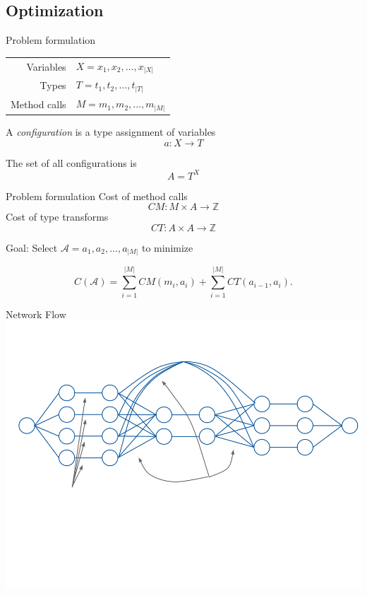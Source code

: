\documentclass{beamer}
\newcommand{\ZZ}{\mathbb{Z}}
\newcommand{\Acal}{\mathcal{A}}
\begin{document}
\subsection{Optimization}

\begin{frame}{Problem formulation}
  \begin{tabular}{rl}
  Variables &$X = x_1, x_2, \dotsc, x_{|X|}$ \\
  Types &$T = t_1, t_2, \dotsc, t_{|T|}$ \\
  Method calls &$M = m_1, m_2, \dotsc, m_{|M|}$
  \end{tabular}
  \vspace{0.5cm}

  A {\em configuration} is a type assignment of variables \[a : X \rightarrow T\]

  The set of all configurations is \[A = T^{X}\]
\end{frame}

\begin{frame}{Problem formulation}
  Cost of method calls \[CM: M \times A \rightarrow \ZZ\]
  Cost of type transforms \[CT: A \times A \rightarrow \ZZ\]

  Goal: Select $\Acal = a_1, a_2, \dotsc, a_{|M|}$ to minimize

  \[C(\Acal) = \sum_{i = 1}^{|M|} CM(m_i, a_i) + \sum_{i = 1}^{|M|} CT(a_{i - 1}, a_i).\]
\end{frame}

\begin{frame}{Network Flow}
  \includegraphics[scale=0.35]{cs706projflow}
\end{frame}
\end{document}
